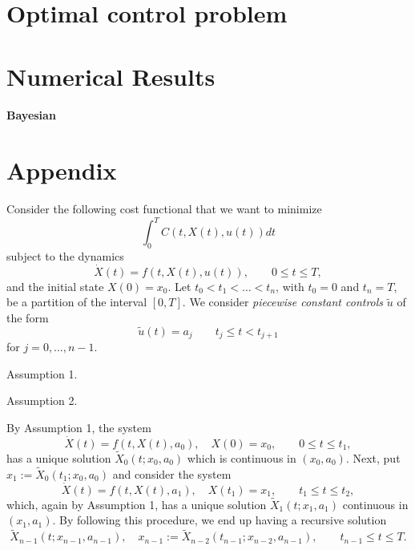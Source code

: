 \documentclass[a4paper,10pt]{amsart}
\begin{document}
    \section{Optimal control problem}
    
    \section{Numerical Results}
    
    \paragraph{Bayesian}
        
    
    \section{Appendix}

Consider the following cost functional that we want to minimize
  \begin{equation}\label{costFunctional}
  \int_0^T C(t,X(t),u(t)) dt
  \end{equation}
subject to the dynamics
  \begin{equation}\label{dynamics}
  \dot{X}(t) = f(t,X(t),u(t)),  \qquad    0\leq t \leq T,
  \end{equation}
and the initial state $X(0)=x_0$. Let $t_0<t_1<\ldots <t_n$, with $t_0=0$ and $t_n=T$, be a partition of the interval $[0,T]$. We consider {\it piecewise constant controls} $\tilde{u}$ of the form 
         \begin{equation}\label{PieceConstCont}
  \tilde{u}(t) = a_j\qquad t_j\leq t < t_{j+1}  
         \end{equation}
 for $j=0,\ldots,n-1$.	

{\sc Assumption 1}. 


{\sc Assumption 2}. 

By Assumption 1, the system
    \[    \dot{X}(t) = f(t,X(t),a_0), \quad X(0)=x_0, \qquad    0\leq t \leq t_1,
  \]
has a unique solution $\tilde{X}_0(t;x_0,a_0)$ which is continuous in $(x_0,a_0)$.  Next, put $x_1:=\tilde{X}_0(t_1;x_0,a_0)$ and consider the system
    \[    \dot{X}(t) = f(t,X(t),a_1), \quad X(t_1)=x_1, \qquad    t_1\leq t \leq t_2,
  \]
which, again by Assumption 1, has a unique solution $\tilde{X}_1(t;x_1,a_1)$ continuous in $(x_1,a_1)$. By following this procedure, we end up having a recursive solution
	\[  \tilde{X}_{n-1}(t;x_{n-1},a_{n-1}),\quad   x_{n-1}:=\tilde{X}_{n-2}(t_{n-1};x_{n-2},a_{n-1}),     \qquad    t_{n-1}\leq t \leq T. \]
\end{document}

